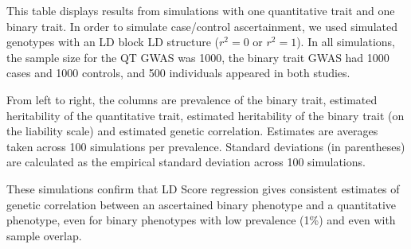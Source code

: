 This table displays results from simulations with one quantitative trait and one binary trait. 
In order to simulate case/control ascertainment, we used simulated genotypes
with an LD block LD structure ($r^2=0$ or $r^2=1$). In all simulations, the sample size for the QT GWAS
was 1000, the binary trait GWAS had 1000 cases and 1000 controls, and 500 individuals 
appeared in both studies. 

From left to right, the columns are prevalence of the binary trait, estimated heritability of
the quantitative trait, estimated heritability of the binary trait (on the liability 
scale) and estimated genetic correlation. Estimates are averages taken across 100 simulations 
per prevalence. Standard deviations (in parentheses) are calculated as the empirical standard
deviation across 100 simulations. 

These simulations confirm that LD Score regression gives consistent estimates of genetic correlation between an ascertained binary phenotype and a quantitative phenotype, even for binary phenotypes with low prevalence (1\%) and even with sample overlap.
